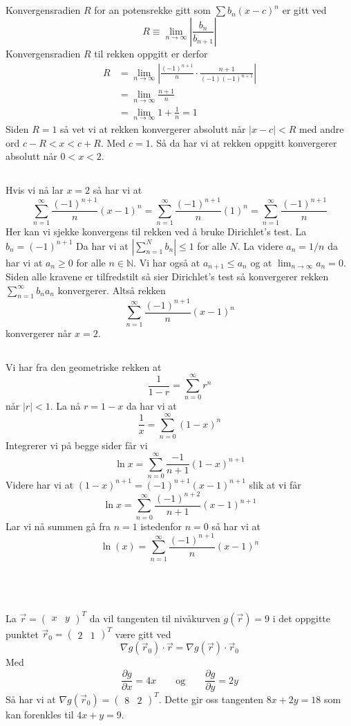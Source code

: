 \documentclass[12pt, a4paper,norsk]{article}
\newcommand{\oppgave}{\,\section{}}
\newcommand{\deloppgave}{\subsection{}}
\newcommand{\pdiff}[2][]{\frac{\partial#1}{\partial #2}}
\begin{document}
	\deloppgave
	Konvergensradien $R$ for an potensrekke gitt som $\sum b_n(x - c)^n$ er gitt ved
	$$
	R \equiv \lim_{n\to\infty}\left|\frac{b_n}{b_{n+1}}\right|
	$$
	Konvergensradien $R$ til rekken oppgitt er derfor
	\begin{align*}
	R &= \lim_{n\to\infty}\left|\frac{\left(-1\right)^{n+1}}{n}\cdot\frac{n+1}{(-1)\left(-1\right)^{n+1}}\right|\\
	&= \lim_{n\to\infty}\frac{n+1}{n} \\
	&= \lim_{n\to\infty}1 + \frac{1}{n} = 1
	\end{align*}
	Siden $R = 1$ så vet vi at rekken konvergerer absolutt når $|x - c| < R$ med andre ord $c - R < x < c + R$. Med $c = 1$. Så da har vi at rekken oppgitt konvergerer absolutt når $0 < x < 2$.
	
	\deloppgave
	Hvis vi nå lar $x = 2$ så har vi at
	$$
	\sum_{n = 1}^\infty \frac{\left(-1\right)^{n+1}}{n}(x-1)^n = \sum_{n = 1}^\infty \frac{\left(-1\right)^{n+1}}{n}(1)^n = \sum_{n = 1}^\infty \frac{\left(-1\right)^{n+1}}{n}
	$$
	Her kan vi sjekke konvergens til rekken ved å bruke Dirichlet's test. La $b_n = (-1)^{n+1}$ Da har vi at $\left|\sum_{n = 1}^N b_n\right| \leq 1$ for alle $N$. La videre $a_n = 1/n$ da har vi at $a_n \geq 0$ for alle $n\in\mathbb N$. Vi har også at $a_{n+1} \leq a_n$ og at $\lim_{n\to\infty} a_n = 0$. Siden alle kravene er tilfredstilt så sier Dirichlet's test så konvergerer rekken $\sum_{n = 1}^\infty b_na_n$ konvergerer. Altså rekken
	$$
	\sum_{n = 1}^\infty \frac{\left(-1\right)^{n+1}}{n}(x-1)^n
	$$
	konvergerer når $x = 2$.
	
	\deloppgave
	Vi har fra den geometriske rekken at
	$$
	\frac{1}{1 - r} = \sum_{n = 0}^\infty r^n
	$$
	når $|r| < 1$. La nå $r = 1 - x$ da har vi at
	$$
	\frac{1}{x} = \sum_{n = 0}^\infty (1 - x)^n
	$$
	Integrerer vi på begge sider får vi
	$$
	\ln{x} = \sum_{n = 0}^\infty \frac{-1}{n+1}(1 - x)^{n+1}
	$$
	Videre har vi at $(1 - x)^{n+1} = (-1)^{n+1}(x - 1)^{n+1}$ slik at vi får
	$$
	\ln{x} = \sum_{n = 0}^\infty \frac{(-1)^{n+2}}{n+1}(x - 1)^{n+1}
	$$
	Lar vi nå summen gå fra $n = 1$ istedenfor $n = 0$ så har vi at
	$$
	\ln(x) = \sum_{n = 1}^\infty \frac{(-1)^{n+1}}{n}(x - 1)^{n}
	$$
	
	\oppgave
	La $\vec{r} = \begin{pmatrix} x & y \end{pmatrix}^T$ da vil tangenten til nivåkurven $g(\vec{r}) = 9$ i det oppgitte punktet $\vec{r}_0 = \begin{pmatrix} 2 & 1\end{pmatrix}^T$ være gitt ved
	$$
	\nabla g(\vec{r}_0)\cdot \vec{r} = \nabla g(\vec{r})\cdot \vec{r}_0
	$$
	Med
	$$
	\pdiff[g]{x} = 4x \qquad \text{og} \qquad \pdiff[g]{y} = 2y
	$$
	Så har vi at $\nabla g(\vec{r}_0) = \begin{pmatrix} 8 & 2\end{pmatrix}^T$. Dette gir oss tangenten $8x + 2y = 18$ som kan forenkles til $4x + y = 9$.
\end{document}
